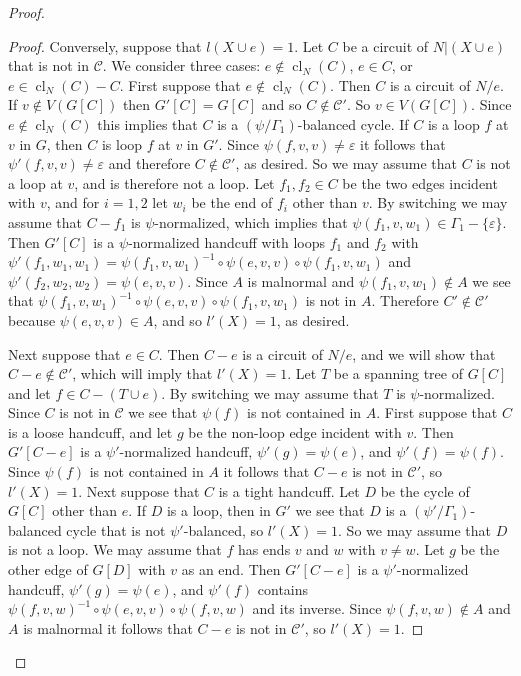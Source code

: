 \documentclass[12pt]{article}
\theoremstyle{definition}
\newcommand{\cC}{\mathcal{C}}
\newcommand{\ep}{\varepsilon}
\DeclareMathOperator{\cl}{cl}
\begin{document}
\begin{proof}
\begin{proof}
Conversely, suppose that $l(X \cup e) = 1$.
Let $C$ be a circuit of $N|(X \cup e)$ that is not in $\cC$.
We consider three cases: $e \notin \cl_N(C)$, $e \in C$, or $e \in \cl_N(C) - C$.
First suppose that $e \notin \cl_N(C)$.
Then $C$ is a circuit of $N/e$.
If $v \notin V(G[C])$ then $G'[C] = G[C]$ and so $C \notin \cC'$.
So $v \in V(G[C])$.
Since $e \notin \cl_N(C)$ this implies that $C$ is a $(\psi/\Gamma_1)$-balanced cycle.
If $C$ is a loop $f$ at $v$ in $G$, then $C$ is loop $f$ at $v$ in $G'$.
Since $\psi(f, v, v) \ne \ep$ it follows that $\psi'(f, v, v) \ne \ep$ and therefore $C \notin \cC'$, as desired.
So we may assume that $C$ is not a loop at $v$, and is therefore not a loop.
Let $f_1,f_2 \in C$ be the two edges incident with $v$, and for $i = 1,2$ let $w_i$ be the end of $f_i$ other than $v$.
By switching we may assume that $C - f_1$ is $\psi$-normalized, which implies that $\psi(f_1, v, w_1) \in \Gamma_1 - \{\ep\}$.
Then $G'[C]$ is a $\psi$-normalized handcuff with loops $f_1$ and $f_2$ with $\psi'(f_1, w_1, w_1) = \psi(f_1, v, w_1)^{-1} \circ \psi(e, v, v) \circ \psi(f_1, v, w_1)$ and $\psi'(f_2, w_2, w_2) = \psi(e, v, v)$.
Since $A$ is malnormal and $\psi(f_1, v, w_1) \notin A$ we see that $\psi(f_1, v, w_1)^{-1} \circ \psi(e, v, v) \circ \psi(f_1, v, w_1)$ is not in $A$.
Therefore $C' \notin \cC'$ because $\psi(e, v, v) \in A$, and so $l'(X) = 1$, as desired.


Next suppose that $e \in C$.
Then $C - e$ is a circuit of $N/e$, and we will show that $C - e \notin \cC'$, which will imply that $l'(X) = 1$.
Let $T$ be a spanning tree of $G[C]$ and let $f \in C - (T \cup e)$.
By switching we may assume that $T$ is $\psi$-normalized.
Since $C$ is not in $\cC$ we see that $\psi(f)$ is not contained in $A$.
First suppose that $C$ is a loose handcuff, and let $g$ be the non-loop edge incident with $v$.
Then $G'[C - e]$ is a $\psi'$-normalized handcuff, $\psi'(g) = \psi(e)$, and $\psi'(f) = \psi(f)$.
Since $\psi(f)$ is not contained in $A$ it follows that $C - e$ is not in $\cC'$, so $l'(X) = 1$.
Next suppose that $C$ is a tight handcuff.
Let $D$ be the cycle of $G[C]$ other than $e$.
If $D$ is a loop, then in $G'$ we see that $D$ is a $(\psi'/\Gamma_1)$-balanced cycle that is not $\psi'$-balanced, so $l'(X) = 1$.
So we may assume that $D$ is not a loop.
We may assume that $f$ has ends $v$ and $w$ with $v \ne w$.
Let $g$ be the other edge of $G[D]$ with $v$ as an end.
Then $G'[C - e]$ is a $\psi'$-normalized handcuff,
$\psi'(g) = \psi(e)$, and $\psi'(f)$ contains $\psi(f, v, w)^{-1} \circ \psi(e, v, v) \circ \psi(f, v, w)$ and its inverse.
Since $\psi(f, v, w) \notin A$ and $A$ is malnormal it follows that $C - e$ is not in $\cC'$, so $l'(X) = 1$.


\end{proof}
\end{proof}
\end{document}
